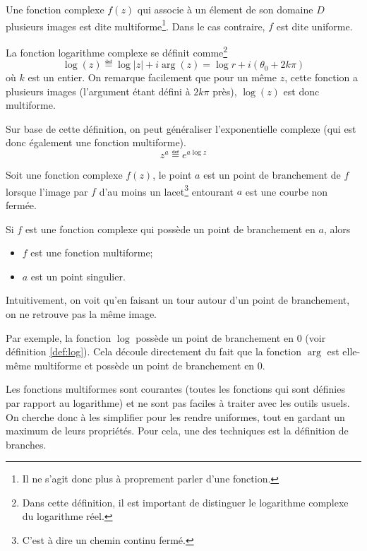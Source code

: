 \begin{mydef}
	Une fonction complexe $f(z)$ qui associe à un élement de son
	domaine $D$ plusieurs images est dite multiforme\footnote{Il
	ne s'agit donc plus à proprement parler d'une fonction.}. Dans
	le cas contraire, $f$ est dite uniforme.
\end{mydef}

\begin{mydef}\label{def:log}
	La fonction logarithme complexe se définit comme\footnote{Dans cette
	définition, il est important de distinguer le logarithme complexe
	du logarithme réel.}
	$$\log(z) \eqdef \log|z| + i\arg(z) = \log r + i(\theta_0 + 2k\pi)$$
	où $k$ est un entier. On remarque facilement que pour un même $z$,
	cette fonction a plusieurs images (l'argument étant défini à $2k\pi$
	près), $\log(z)$ est donc multiforme.
\end{mydef}

Sur base de cette définition, on peut généraliser l'exponentielle
complexe (qui est donc également une fonction multiforme).
\[z^a \eqdef e^{a\log z}\]


\begin{mydef}
	Soit une fonction complexe $f(z)$,
	le point $a$ est un point de branchement de $f$ lorsque
	l'image par $f$ d'au moins un lacet\footnote{C'est à dire un chemin
	continu fermé.} entourant $a$ est une courbe non fermée.
\end{mydef}

\begin{myprop}
    Si $f$ est une fonction complexe qui possède un
    point de branchement en $a$, alors
    \begin{itemize}
        \item $f$ est une fonction multiforme;
        \item $a$ est un point singulier.
    \end{itemize}
\end{myprop}

Intuitivement, on voit qu'en \og faisant un tour \fg autour d'un point
de branchement, on ne \og retrouve \fg pas la même image.

Par exemple, la fonction $\log$ possède un point de branchement
en $0$ (voir définition \ref{def:log}).
Cela découle directement du fait que la fonction $\arg$ est elle-même
multiforme et possède un point de branchement en $0$.

Les fonctions multiformes sont courantes
(toutes les fonctions qui sont définies par rapport au logarithme)
et ne sont pas faciles à traiter avec les outils usuels.
On cherche donc à les simplifier pour les rendre uniformes, tout en
gardant un maximum de leurs propriétés. Pour cela, une des techniques
est la définition de branches.

